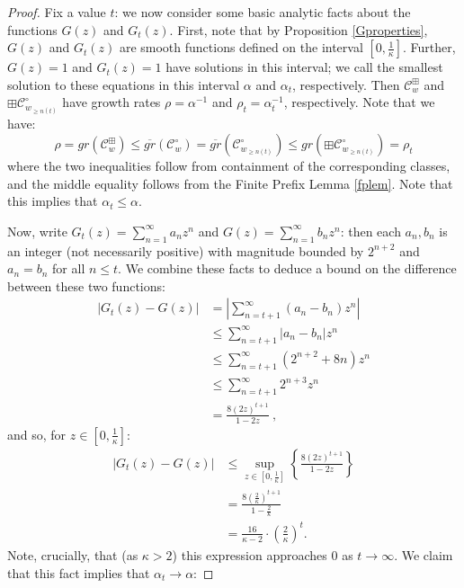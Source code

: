 \documentclass[10pt,a4paper]{amsart}
\theoremstyle{plain}
\theoremstyle{definition}
\theoremstyle{remark}
\begin{document}
\begin{proof}
Fix a value $t$: we now consider some basic analytic facts about the functions $G(z)$ and $G_{t}(z)$. First, note that by Proposition \ref{Gproperties}, $G(z)$ and $G_{t}(z)$ are smooth functions defined on the interval $\left[0,\frac{1}{\kappa}\right]$. Further, $G(z) = 1$ and $G_{t}(z) = 1$ have solutions in this interval; we call the smallest solution to these equations in this interval $\alpha$ and $\alpha_{t}$, respectively. Then $\mathcal{C}^{\boxplus}_{w}$ and $\boxplus\mathcal{C}^{\circ}_{w_{\geq n(t)}}$ have growth rates $\rho = \alpha^{-1}$ and $\rho_{t} = \alpha^{-1}_{t}$, respectively. Note that we have:
\[
\rho = gr(\mathcal{C}^{\boxplus}_{w}) \leq \overline{gr}(\mathcal{C}^{\circ}_{w}) = \overline{gr}(\mathcal{C}^{\circ}_{w_{\geq n(t)}}) \leq gr(\boxplus\mathcal{C}^{\circ}_{w_{\geq n(t)}}) = \rho_{t}
\]
where the two inequalities follow from containment of the corresponding classes, and the middle equality follows from the Finite Prefix Lemma \ref{fplem}. Note that this implies that $\alpha_{t} \leq \alpha$. 

Now, write $G_{t}(z) = \sum_{n=1}^{\infty}a_{n}z^n$ and $G(z) = \sum_{n=1}^{\infty}b_{n}z^n$: then each $a_{n}, b_{n}$ is an integer (not necessarily positive) with magnitude bounded by $2^{n+2}$ and $a_{n} = b_{n}$ for all $n \leq t$. We combine these facts to deduce a bound on the difference between these two functions:
\[
\begin{split}
\left|G_{t}(z) - G(z)\right| & = \left|\sum_{n=t+1}^{\infty}(a_{n} - b_{n})z^{n}\right| \\
 & \leq \sum_{n=t+1}^{\infty}\left|a_{n} - b_{n}\right|z^n \\
 & \leq \sum_{n=t+1}^{\infty}(2^{n+2} + 8n)z^{n} \\
 & \leq \sum_{n=t+1}^{\infty}2^{n+3}z^{n} \\
 & = \frac{8(2z)^{t+1}}{1-2z} \ ,
\end{split}
\]
and so, for $z \in \left[0,\frac{1}{\kappa}\right]$:
\[
\begin{split}
\left|G_{t}(z) - G(z)\right| & \leq \sup_{z \in \left[0,\frac{1}{\kappa}\right]}\left\{\frac{8(2z)^{t+1}}{1-2z}\right\} \\
 & = \frac{8(\frac{2}{\kappa})^{t+1}}{1 - \frac{2}{\kappa}} \\
 & = \frac{16}{\kappa - 2} \cdot \left(\frac{2}{\kappa}\right)^{t}.
\end{split}
\]
Note, crucially, that (as $\kappa > 2$) this expression approaches $0$ as $t \rightarrow \infty$. We claim that this fact implies that $\alpha_{t} \rightarrow \alpha$:


\end{proof}
\end{document}

